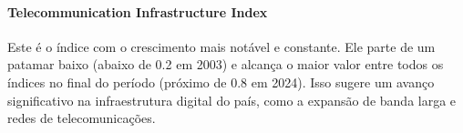 \paragraph{Telecommunication Infrastructure Index} Este é o índice com o crescimento mais notável e constante. Ele parte de um patamar baixo (abaixo de 0.2 em 2003) e alcança o maior valor entre todos os índices no final do período (próximo de 0.8 em 2024). Isso sugere um avanço significativo na infraestrutura digital do país, como a expansão de banda larga e redes de telecomunicações.